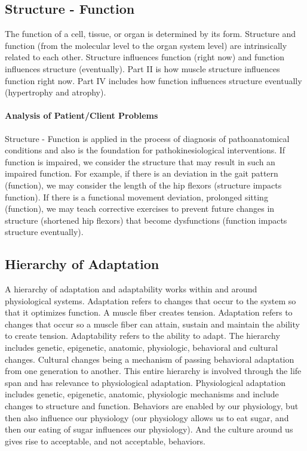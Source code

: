\subsection{Structure - Function}
The function of a cell, tissue, or organ is determined by its form. Structure and function (from the molecular level to the organ system level) are intrinsically related to each other. Structure influences function (right now) and function influences structure (eventually). Part II is how muscle structure influences function right now. Part IV includes how function influences structure eventually (hypertrophy and atrophy).

\paragraph{Analysis of Patient/Client Problems}
Structure - Function is applied in the process of diagnosis of pathoanatomical conditions and also is the foundation for pathokinesiological interventions. If function is impaired, we consider the structure that may result in such an impaired function. For example, if there is an deviation in the gait pattern (function), we may consider the length of the hip flexors (structure impacts function). If there is a functional movement deviation, prolonged sitting (function), we may teach corrective exercises to prevent future changes in structure (shortened hip flexors) that become dysfunctions (function impacts structure eventually).

\subsection{Hierarchy of Adaptation}

A hierarchy of adaptation and adaptability works within and around physiological systems. Adaptation refers to changes that occur to the system so that it optimizes function. A muscle fiber creates tension. Adaptation refers to changes that occur so a muscle fiber can attain, sustain and maintain the ability to create tension. Adaptability refers to the ability to adapt. The hierarchy includes genetic, epigenetic, anatomic, physiologic, behavioral and cultural changes. Cultural changes being a mechanism of passing behavioral adaptation from one generation to another. This entire hierarchy is involved through the life span and has relevance to physiological adaptation. Physiological adaptation includes genetic, epigenetic, anatomic, physiologic mechanisms and include changes to structure and function. Behaviors are enabled by our physiology, but then also influence our physiology (our physiology allows us to eat sugar, and then our eating of sugar influences our physiology). And the culture around us gives rise to acceptable, and not acceptable, behaviors. 

